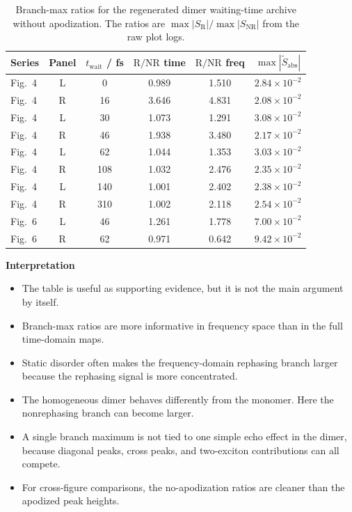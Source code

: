 \begin{table}[htbp]
    \centering
    \small
    \caption{Branch-max ratios for the regenerated dimer waiting-time archive without apodization. The ratios are $\max|S_{\mathrm{R}}|/\max|S_{\mathrm{NR}}|$ from the raw plot logs.}
    \label{tab:results_dimer_branch_ratios}
    \begin{tabular}{@{}lccccc@{}}
        \toprule
        Series & Panel & $t_{\mathrm{wait}}$ / fs & $\mathrm{R}/\mathrm{NR}$ time & $\mathrm{R}/\mathrm{NR}$ freq & $\max|\tilde{S}_{\mathrm{abs}}|$ \\
        \midrule
        Fig.~4 & L & 0   & 0.989 & 1.510 & $2.84\times10^{-2}$ \\
        Fig.~4 & R & 16  & 3.646 & 4.831 & $2.08\times10^{-2}$ \\
        Fig.~4 & L & 30  & 1.073 & 1.291 & $3.08\times10^{-2}$ \\
        Fig.~4 & R & 46  & 1.938 & 3.480 & $2.17\times10^{-2}$ \\
        Fig.~4 & L & 62  & 1.044 & 1.353 & $3.03\times10^{-2}$ \\
        Fig.~4 & R & 108 & 1.032 & 2.476 & $2.35\times10^{-2}$ \\
        Fig.~4 & L & 140 & 1.001 & 2.402 & $2.38\times10^{-2}$ \\
        Fig.~4 & R & 310 & 1.002 & 2.118 & $2.54\times10^{-2}$ \\
        Fig.~6 & L & 46  & 1.261 & 1.778 & $7.00\times10^{-2}$ \\
        Fig.~6 & R & 62  & 0.971 & 0.642 & $9.42\times10^{-2}$ \\
        \bottomrule
    \end{tabular}
\end{table}

\textbf{Interpretation}
\begin{itemize}
    \item The table is useful as supporting evidence, but it is not the main argument by itself.
    \item Branch-max ratios are more informative in frequency space than in the full time-domain maps.
    \item Static disorder often makes the frequency-domain rephasing branch larger because the rephasing signal is more concentrated.
    \item The homogeneous dimer behaves differently from the monomer. Here the nonrephasing branch can become larger.
    \item A single branch maximum is not tied to one simple echo effect in the dimer, because diagonal peaks, cross peaks, and two-exciton contributions can all compete.
    \item For cross-figure comparisons, the no-apodization ratios are cleaner than the apodized peak heights.
\end{itemize}



